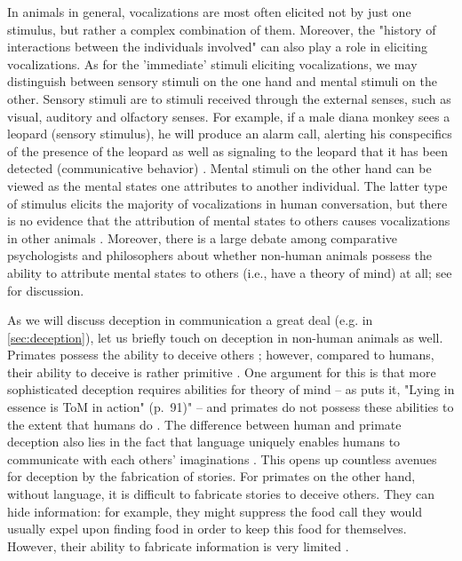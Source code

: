 In animals in general, vocalizations are most often elicited not by just one stimulus, but rather a complex combination of them. Moreover, the "history of interactions between the individuals involved" \citep[p.~151]{SeyfarthCheney03} can also play a role in eliciting vocalizations. As for the 'immediate' stimuli eliciting vocalizations, we may distinguish between sensory stimuli on the one hand and mental stimuli on the other. Sensory stimuli are to stimuli received through the external senses, such as visual, auditory and olfactory senses.
For example, if a male diana monkey sees a leopard (sensory stimulus), he will produce an alarm call, alerting his conspecifics of the presence of the leopard as well as signaling to the leopard that it has been detected (communicative behavior) \citep{Zuberbuhler97}.
Mental stimuli on the other hand can be viewed as the mental states one attributes to another individual.
The latter type of stimulus elicits the majority of vocalizations in human conversation, but there is no evidence that the attribution of mental states to others causes vocalizations in other animals \citep{SeyfarthCheney03}.
Moreover, there is a large debate among comparative psychologists and philosophers about whether non-human animals possess the ability to attribute mental states to others (i.e., have a theory of mind) at all; see \citet[Chapter~6]{Andrews15} for discussion.

As we will discuss deception in communication a great deal (e.g. in \cref{sec:deception}), let us briefly touch on deception in non-human animals as well.
Primates possess the ability to deceive others ;
however, compared to humans, their ability to deceive is rather primitive \citep{Dor17}.
One argument for this is that more sophisticated deception requires abilities for theory of mind -- as \citep{Lee13} puts it, "Lying in essence is ToM in action" (p.~91)" -- and primates do not possess these abilities to the extent that humans do \citep[cf.][Chapter~6]{Andrews15}.
The difference between human and primate deception also lies in the fact that language uniquely enables humans to communicate with each others' imaginations \citep{Dor17}. This opens up countless avenues for deception by the fabrication of stories. For primates on the other hand, without language, it is difficult to fabricate stories to deceive others. They can hide information: for example, they might suppress the food call they would usually expel upon finding food in order to keep this food for themselves. However, their ability to fabricate information is very limited \citep{Dor17}.

